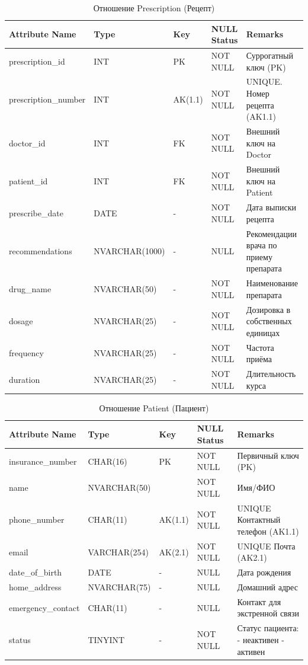 \documentclass[a4paper, 14pt]{extarticle}
\begin{document}
\begin{table}[h!]
\captionsetup{singlelinecheck=false, position=top}
\caption{Отношение Prescription (Рецепт)}
\begin{tabularx}{\textwidth}{|l|l|l|l|Y|}
\hline
  \textbf{Attribute Name} & \textbf{Type} & \textbf{Key} & \textbf{NULL Status} & \textbf{Remarks}\\
\hline
prescription\_id & INT & PK & NOT NULL & Суррогатный ключ (PK)\\
\hline
prescription\_number & INT & AK(1.1) & NOT NULL & UNIQUE. Номер рецепта (AK1.1)\\
\hline
doctor\_id & INT & FK & NOT NULL & Внешний ключ на Doctor\\
\hline
patient\_id & INT & FK & NOT NULL & Внешний ключ на Patient\\
\hline
prescribe\_date & DATE & - & NOT NULL & Дата выписки рецепта\\
\hline
recommendations & NVARCHAR(1000) & - & NULL & Рекомендации врача по приему препарата\\
\hline
drug\_name & NVARCHAR(50) & - & NOT NULL & Наименование препарата\\
\hline
dosage & NVARCHAR(25) & - & NOT NULL & Дозировка в собственных единицах\\
\hline
frequency & NVARCHAR(25) & - & NOT NULL & Частота приёма\\
\hline
duration & NVARCHAR(25) & - & NOT NULL & Длительность курса\\
\hline
\end{tabularx}
\end{table}

\begin{table}[h!]
\captionsetup{singlelinecheck=false, position=top}
\caption{Отношение Patient (Пациент)}
\begin{tabularx}{\textwidth}{|l|l|l|l|Y|}
\hline
  \textbf{Attribute Name} & \textbf{Type} & \textbf{Key} & \textbf{NULL Status} & \textbf{Remarks}\\
\hline
insurance\_number & CHAR(16) & PK & NOT NULL & Первичный ключ (PK)\\
\hline
name & NVARCHAR(50) & & NOT NULL & Имя/ФИО \\
\hline
phone\_number & CHAR(11) & AK(1.1) & NOT NULL & UNIQUE Контактный телефон (AK1.1)\\
\hline
email & VARCHAR(254) & AK(2.1) & NOT NULL & UNIQUE Почта (AK2.1)\\
\hline
date\_of\_birth & DATE & - & NULL & Дата рождения\\
\hline
home\_address & NVARCHAR(75) & - & NULL & Домашний адрес\\
\hline
emergency\_contact & CHAR(11) & - & NULL & Контакт для экстренной связи\\
\hline
status & TINYINT & - & NOT NULL & Статус пациента:  - неактивен  - активен \\
\hline
\end{tabularx}
\end{table}
\end{document}
